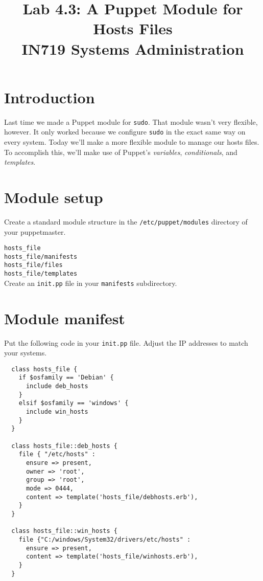 \documentclass{article}   	%
\title{Lab 4.3: A Puppet Module for Hosts Files \\ IN719 Systems Administration}
\begin{document}
\maketitle

\section*{Introduction}
Last time we made a Puppet module for \texttt{sudo}.  That module wasn't very flexible, however.  It only worked because we configure \texttt{sudo} in the exact same way on every system. Today we'll make a more flexible module to manage our hosts files.  To accomplish this, we'll make use of Puppet's \emph{variables}, \emph{conditionals}, and \emph{templates}.

\section{Module setup}
Create a standard module structure in the \texttt{/etc/puppet/modules} directory of your puppetmaster.

\texttt{hosts\_file} \\
\texttt{hosts\_file/manifests} \\
\texttt{hosts\_file/files} \\
\texttt{hosts\_file/templates} \\

Create an \texttt{init.pp} file in your \texttt{manifests} subdirectory.

\section{Module manifest}
Put the following code in your \texttt{init.pp} file.  Adjust the IP addresses to match your systems.

\begin{verbatim}
  class hosts_file {
    if $osfamily == 'Debian' {
      include deb_hosts
    }
    elsif $osfamily == 'windows' {
      include win_hosts
    }
  }

  class hosts_file::deb_hosts {
    file { "/etc/hosts" :
      ensure => present,
      owner => 'root',
      group => 'root',
      mode => 0444,
      content => template('hosts_file/debhosts.erb'),
    }
  }

  class hosts_file::win_hosts {
    file {"C:/windows/System32/drivers/etc/hosts" :
      ensure => present,
      content => template('hosts_file/winhosts.erb'),
    }
  }
  
\end{verbatim}
\end{document}
